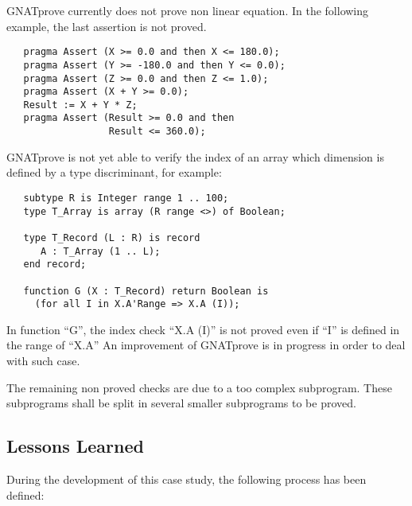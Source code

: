 \documentclass[10pt,a4paper,twocolumn]{article}
\newcommand{\gnatprove}{GNATprove\xspace}
\begin{document}
\vspace{5mm}

\gnatprove currently does not prove non linear equation.
In the following example, the last assertion is not proved.

\begin{lstlisting}
   pragma Assert (X >= 0.0 and then X <= 180.0);
   pragma Assert (Y >= -180.0 and then Y <= 0.0);
   pragma Assert (Z >= 0.0 and then Z <= 1.0);
   pragma Assert (X + Y >= 0.0);
   Result := X + Y * Z;
   pragma Assert (Result >= 0.0 and then
                  Result <= 360.0);
\end{lstlisting}

\vspace{5mm}

\gnatprove is not yet able to verify the index of an array which dimension is defined by a type discriminant, for example:

\begin{lstlisting}
   subtype R is Integer range 1 .. 100;
   type T_Array is array (R range <>) of Boolean;

   type T_Record (L : R) is record
      A : T_Array (1 .. L);
   end record;

   function G (X : T_Record) return Boolean is
     (for all I in X.A'Range => X.A (I));
\end{lstlisting}

In function ``G'', the index check ``X.A (I)'' is not proved even if ``I'' is defined in the range of ``X.A''
An improvement of \gnatprove is in progress in order to deal with such case.

\vspace{5mm}

The remaining non proved checks are due to a too complex subprogram.
These subprograms shall be split in several smaller subprograms to be proved.

\subsection{Lessons Learned}

During the development of this case study, the following process has been defined:
\end{document}
